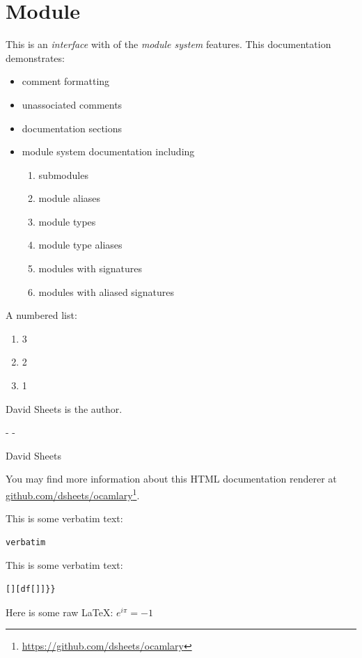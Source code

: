 \section{Module }\label{Ocamlary}%
This is an \emph{interface} with  of the \emph{module system} features. This documentation demonstrates:

\begin{itemize}\item{comment formatting}%
\item{unassociated comments}%
\item{documentation sections}%
\item{module system documentation including

\begin{enumerate}\item{submodules}%
\item{module aliases}%
\item{module types}%
\item{module type aliases}%
\item{modules with signatures}%
\item{modules with aliased signatures}\end{enumerate}%
}\end{itemize}%
A numbered list:

\begin{enumerate}\item{3}%
\item{2}%
\item{1}\end{enumerate}%
David Sheets is the author.

\begin{description}\kern-\topsep
\makeatletter\advance\@topsepadd-\topsep\makeatother%
\item[{author}]{David Sheets}\end{description}%
You may find more information about this HTML documentation renderer at \href{https://github.com/dsheets/ocamlary}{github.com/dsheets/ocamlary}\footnote{\url{https://github.com/dsheets/ocamlary}}.

This is some verbatim text:

\begin{verbatim}verbatim\end{verbatim}%
This is some verbatim text:

\begin{verbatim}[][df[]]}}\end{verbatim}%
Here is some raw LaTeX:  $e^{i\pi} = -1$ 

